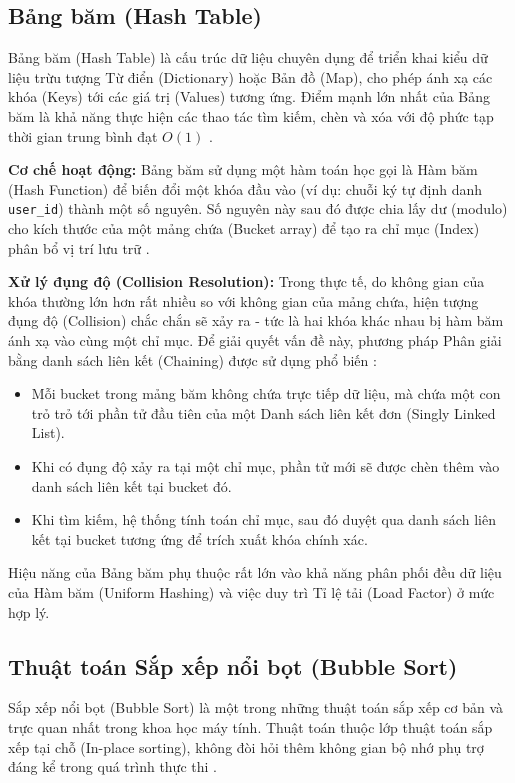 \documentclass{report}
\begin{document}
\subsection{Bảng băm (Hash Table)}

Bảng băm (Hash Table) là cấu trúc dữ liệu chuyên dụng để triển khai kiểu dữ liệu trừu tượng Từ điển (Dictionary) hoặc Bản đồ (Map), cho phép ánh xạ các khóa (Keys) tới các giá trị (Values) tương ứng. Điểm mạnh lớn nhất của Bảng băm là khả năng thực hiện các thao tác tìm kiếm, chèn và xóa với độ phức tạp thời gian trung bình đạt $O(1)$ \cite{cormen2009}.

\textbf{Cơ chế hoạt động:} Bảng băm sử dụng một hàm toán học gọi là Hàm băm (Hash Function) để biến đổi một khóa đầu vào (ví dụ: chuỗi ký tự định danh \texttt{user\_id}) thành một số nguyên. Số nguyên này sau đó được chia lấy dư (modulo) cho kích thước của một mảng chứa (Bucket array) để tạo ra chỉ mục (Index) phân bổ vị trí lưu trữ \cite{cormen2009}.

\textbf{Xử lý đụng độ (Collision Resolution):} Trong thực tế, do không gian của khóa thường lớn hơn rất nhiều so với không gian của mảng chứa, hiện tượng đụng độ (Collision) chắc chắn sẽ xảy ra - tức là hai khóa khác nhau bị hàm băm ánh xạ vào cùng một chỉ mục. Để giải quyết vấn đề này, phương pháp Phân giải bằng danh sách liên kết (Chaining) được sử dụng phổ biến \cite{cormen2009}:
\begin{itemize}
    \item Mỗi bucket trong mảng băm không chứa trực tiếp dữ liệu, mà chứa một con trỏ trỏ tới phần tử đầu tiên của một Danh sách liên kết đơn (Singly Linked List).
    \item Khi có đụng độ xảy ra tại một chỉ mục, phần tử mới sẽ được chèn thêm vào danh sách liên kết tại bucket đó.
    \item Khi tìm kiếm, hệ thống tính toán chỉ mục, sau đó duyệt qua danh sách liên kết tại bucket tương ứng để trích xuất khóa chính xác.
\end{itemize}

Hiệu năng của Bảng băm phụ thuộc rất lớn vào khả năng phân phối đều dữ liệu của Hàm băm (Uniform Hashing) và việc duy trì Tỉ lệ tải (Load Factor) ở mức hợp lý.

\subsection{Thuật toán Sắp xếp nổi bọt (Bubble Sort)}

Sắp xếp nổi bọt (Bubble Sort) là một trong những thuật toán sắp xếp cơ bản và trực quan nhất trong khoa học máy tính. Thuật toán thuộc lớp thuật toán sắp xếp tại chỗ (In-place sorting), không đòi hỏi thêm không gian bộ nhớ phụ trợ đáng kể trong quá trình thực thi \cite{nguyenducnghia2013}.
\end{document}
